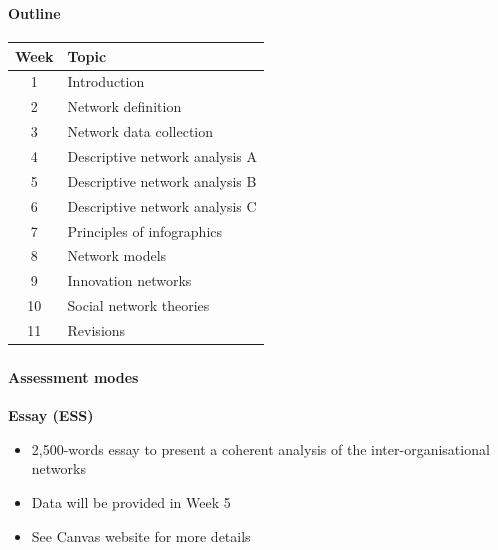\documentclass[8pt]{beamer}
\begin{document}

\begin{frame}
\frametitle{\insertsection}
\framesubtitle{Outline}

\centering
\def\arraystretch{1.5}
\begin{tabular}{cl}
\toprule
\textbf{Week} & \textbf{Topic}\\
\hline
1  & Introduction\\
2  & Network definition\\
3  & Network data collection\\
4  & Descriptive network analysis A\\
5  & Descriptive network analysis B\\
6  & Descriptive network analysis C\\
7  & Principles of infographics\\
8  & Network models\\
9  & Innovation networks\\
10 & Social network theories\\
11 & Revisions\\
\bottomrule
\end{tabular}

\end{frame}


\begin{frame}
\frametitle{\insertsection}
\framesubtitle{Assessment modes}

\textbf{Essay (ESS)} {\color{blue}{[50\% weighting]}}
	\begin{itemize}
	\item 2,500-words essay to present a coherent analysis of the inter-organisational networks 
	\item Data will be provided in Week 5
	\item See Canvas website for more details
	\end{itemize}

\end{frame}
\end{document}
